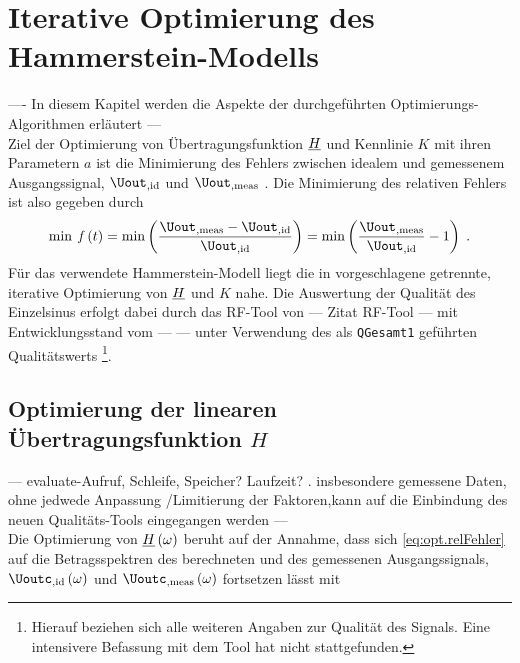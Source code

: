 \documentclass[../Report.tex]{subfiles}
\begin{document}
\chapter{Iterative Optimierung des Hammerstein-Modells}
\label{chap:opt}
---- In diesem Kapitel werden die Aspekte der durchgeführten Optimierungs-Algorithmen erläutert --- \\
Ziel der Optimierung von Übertragungsfunktion $\underline{H}$ und Kennlinie $K$ mit ihren Parametern $a$ ist die Minimierung des Fehlers zwischen idealem und gemessenem Ausgangssignal, $\Uout_{, \mathrm{id}}$ und $\Uout_{, \mathrm{meas}}$ . Die Minimierung des relativen Fehlers ist also gegeben durch
\begin{align}
\label{eq:opt.relFehler}
	\min \; \mathit{f} \oft = \min \left( \frac{\Uout_{, \mathrm{meas}}  - \Uout_{, \mathrm{id}} }{ \Uout_{, \mathrm{id}} } \right) 
	= \min \left( \frac{ \Uout_{, \mathrm{meas}}}{ \Uout_{, \mathrm{id}}} -1 \right) 
	\; .
\end{align}
Für das verwendete Hammerstein-Modell liegt die in \cite{----Jens---} %
vorgeschlagene getrennte, iterative Optimierung von $\underline{H}$ und $K$ nahe. 
Die Auswertung der Qualität des Einzelsinus erfolgt dabei durch das RF-Tool von --- Zitat RF-Tool --- mit Entwicklungsstand vom --- --- unter Verwendung des als \lstinline{QGesamt1} geführten Qualitätswerts \footnote{\label{foot:opt.H.quality}Hierauf beziehen sich alle weiteren Angaben zur Qualität des Signals. Eine intensivere Befassung mit dem Tool hat nicht stattgefunden.}.




\section{Optimierung der linearen Übertragungsfunktion $H$}
\label{sec:opt.H}
--- evaluate-Aufruf, Schleife, Speicher? Laufzeit? . insbesondere gemessene Daten, ohne jedwede Anpassung /Limitierung der Faktoren,kann auf die Einbindung des neuen Qualitäts-Tools eingegangen werden --- \\

Die Optimierung von $\underline{H} \left( \omega \right)$ beruht auf der Annahme, dass sich \eqref{eq:opt.relFehler} auf die Betragsspektren des berechneten und des gemessenen Ausgangssignals, $\Uoutc_{, \mathrm{id}} \ofomega $ und $\Uoutc_{, \mathrm{meas}} \ofomega $ fortsetzen lässt mit 
\end{document}
